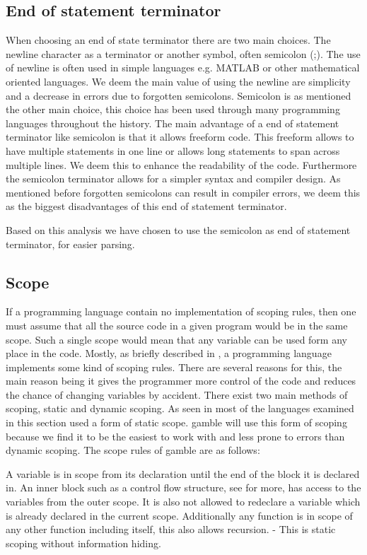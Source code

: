 \subsection*{End of statement terminator}
When choosing an end of state terminator there are two main choices.
The newline character as a terminator or another symbol, often semicolon (;).
The use of newline is often used in simple languages e.g. MATLAB or other mathematical oriented languages. 
We deem the main value of using the newline are simplicity and a decrease in errors due to forgotten semicolons.
Semicolon is as mentioned the other main choice, this choice has been used through many programming languages throughout the history. 
The main advantage of a end of statement terminator  like semicolon is that it allows freeform code. 
This freeform allows to have multiple statements in one line or allows long statements to span across multiple lines.
We deem this to enhance the readability of the code.
Furthermore the semicolon terminator allows for a simpler syntax and compiler design.
As mentioned before forgotten semicolons can result in compiler errors, we deem this as the biggest disadvantages of this end of statement terminator.

Based on this analysis we have chosen to use the semicolon as end of statement terminator, for easier parsing.

\subsection*{Scope}\label{subsec:Scope}
If a programming language contain no implementation of scoping rules, then one must assume that all the source code in a given program would be in the same scope.
Such a single scope would mean that any variable can be used form any place in the code. 
Mostly, as briefly described in , a programming language implements some kind of scoping rules.
There are several reasons for this, the main reason being it gives the programmer more control of the code and reduces the chance of changing variables by accident.
There exist two main methods of scoping, static and dynamic scoping.
As seen in  most of the languages examined in this section used a form of static scope. 
\gls{gamble} will use this form of scoping because we find it to be the easiest to work with and less prone to errors than dynamic scoping.
The scope rules of \gls{gamble} are as follows:

A variable is in scope from its declaration until the end of the block it is declared in.
An inner block such as a control flow structure, see  for more, has access to the variables from the outer scope. 
It is also not allowed to redeclare a variable which is already declared in the current scope. 
Additionally any function is in scope of any other function including itself, this also allows recursion. 
- This is static scoping without information hiding. 

